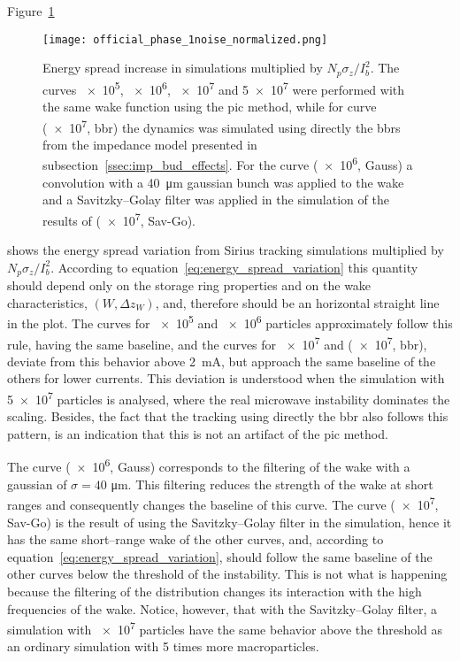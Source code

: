     Figure~\ref{fig:noise_effect}
    \begin{figure}
        \centering
        \texttt{[image: official\_phase\_1noise\_normalized.png]}
        \caption[Normalized energy spread increase in Simulations induced by noise.]{Energy spread increase in simulations multiplied by $N_p\sigma_z/I_b^2$. The curves \num{e5}, \num{e6}, \num{e7} and \num{5e7} were performed with the same wake function using the \gls{pic} method, while for curve (\num{e7}, \gls{bbr}) the dynamics was simulated using directly the \glspl{bbr} from the impedance model presented in subsection~\ref{ssec:imp_bud_effects}.
        For the curve (\num{e6}, Gauss) a convolution with a \SI{40}{\micro\meter} gaussian bunch was applied to the wake and a Savitzky--Golay filter was applied in the simulation of the results of (\num{e7}, Sav-Go).}
        \label{fig:noise_effect}
    \end{figure}
    shows the energy spread variation from Sirius tracking simulations multiplied by $N_p\sigma_z/I_b^2$. According to equation~\eqref{eq:energy_spread_variation} this quantity should depend only on the storage ring properties and on the wake characteristics, $(W, \Delta z_W)$, and, therefore should be an horizontal straight line in the plot. The curves for \num{e5} and \num{e6} particles approximately follow this rule, having the same baseline, and the curves for \num{e7} and (\num{e7}, \gls{bbr}), deviate from this behavior above \SI{2}{\milli\ampere}, but approach the same baseline of the others for lower currents. This deviation is understood when the simulation with \num{5e7} particles is analysed, where the real microwave instability dominates the scaling. Besides, the fact that the tracking using directly the \gls{bbr} also follows this pattern, is an indication that this is not an artifact of the \gls{pic} method.

    The curve (\num{e6}, Gauss) corresponds to the filtering of the wake with a gaussian of $\sigma=40$ \si{\micro\meter}. This filtering reduces the strength of the wake at short ranges and consequently changes the baseline of this curve. The curve (\num{e7}, Sav-Go) is the result of using the Savitzky--Golay filter in the simulation, hence it has the same short--range wake of the other curves, and, according to equation~\eqref{eq:energy_spread_variation}, should follow the same baseline of the other curves below the threshold of the instability. This is not what is happening because the filtering of the distribution changes its interaction with the high frequencies of the wake. Notice, however, that with the Savitzky--Golay filter, a simulation with \num{e7} particles have the same behavior above the threshold as an ordinary simulation with \num{5} times more macroparticles.

